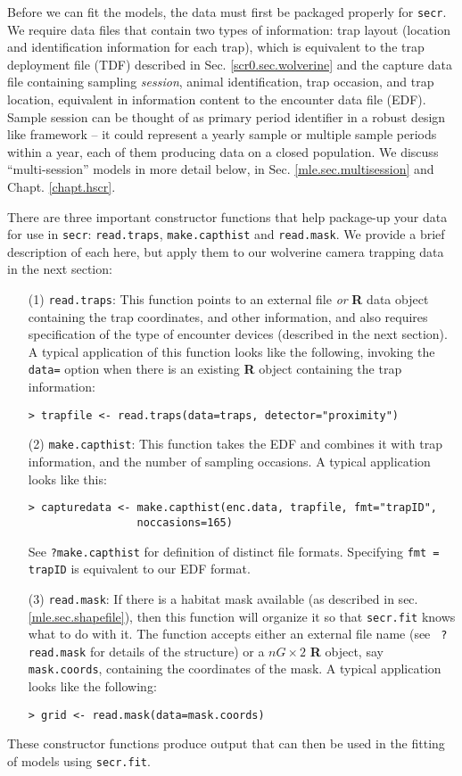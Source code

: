 Before we can fit the models, the data must first be packaged properly
for 
\mbox{\tt secr}.  
We require data files that contain two types of information:
trap layout (location and
identification information for each trap), which is equivalent to the
trap deployment file (TDF) described in Sec. \ref{scr0.sec.wolverine}
and the capture data file containing 
sampling {\it session}, animal identification, trap occasion, and trap
location,  equivalent in information content to the encounter data file (EDF).
Sample session can be thought of as primary period identifier in a
robust design like framework -- it could represent a yearly sample or
multiple sample periods within a year, each of them producing data on
a closed population. We discuss ``multi-session'' models in more
detail below, in Sec. \ref{mle.sec.multisession} and Chapt. \ref{chapt.hscr}.


There are three important constructor functions that help package-up
your 
data for use in \mbox{\tt secr}:
\mbox{\tt read.traps},
\mbox{\tt make.capthist} and
\mbox{\tt read.mask}. 
We provide a brief description of each here, but apply them to our
wolverine camera trapping data in the next section:
\begin{itemize}
\item[(1)] 
\mbox{\tt read.traps}: This function points to an external file {\it or}
{\bf R} data object containing the trap coordinates, and other
information, and also requires specification of the type of encounter
devices (described in the next section). A typical application of this
function looks like the following, invoking the \mbox{\tt data=} option 
when there is an existing {\bf R} object
containing the trap information:
\begin{verbatim}
> trapfile <- read.traps(data=traps, detector="proximity")
\end{verbatim}
\item[(2)] \mbox{\tt make.capthist}: This function takes the EDF and combines it
with trap information, and the number of sampling occasions. A typical
application looks like this:
\begin{verbatim}
> capturedata <- make.capthist(enc.data, trapfile, fmt="trapID",
                 noccasions=165)
\end{verbatim}
See \mbox{\tt ?make.capthist} for definition of distinct file
formats. Specifying  \mbox{\tt fmt = trapID}  is equivalent to our EDF format.
\item[(3)] \mbox{\tt read.mask}: If there is a habitat mask
  available 
(as described in sec. \ref{mle.sec.shapefile}), then this function
will organize it so that \mbox{\tt secr.fit} knows what to do with it.
The function accepts either an external file name (see \mbox{\tt
  ?read.mask} for details of the structure) or a $nG \times 2$ {\bf R}
object, say \mbox{\tt mask.coords},
containing the coordinates of the mask. A typical application looks
like the following:
\begin{verbatim}
> grid <- read.mask(data=mask.coords)
\end{verbatim}
\end{itemize}
These constructor functions produce output that can then be used in
the fitting of models using \mbox{\tt secr.fit}.

